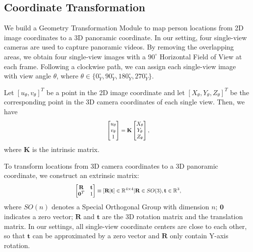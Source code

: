 \documentclass{article}
\begin{document}
\subsection{Coordinate Transformation}
We build a Geometry Transformation Module to map person locations from 2D image coordinates to a 3D panoramic coordinate. In our setting, four single-view cameras are used to capture panoramic videos. By removing the overlapping areas, we obtain four single-view images with a $90^{\circ}$ Horizontal Field of View at each frame. Following a clockwise path, we can assign each single-view image with view angle $\theta$, where $\theta \in \{0^{\circ}_{Y}, 90^{\circ}_{Y},180^{\circ}_{Y}, 270^{\circ}_{Y}\}$.

Let $[u_{\theta}, v_{\theta}]^{T}$ be a point in the 2D image coordinate and let $[X_{\theta}, Y_{\theta}, Z_{\theta}]^{T}$ be the corresponding point in the 3D camera coordinates of each single view. Then, we have 
\begin{equation}
\label{eq:intri}
\centering
\scalebox{0.8}{
\begin{math}
\begin{split}
\begin{bmatrix}
u_{\theta}\\ 
v_{\theta}\\ 
1\\
\end{bmatrix} = \mathbf{K}
\begin{bmatrix}
X_{\theta}\\ 
Y_{\theta}\\ 
Z_{\theta}\\ 
\end{bmatrix},\\
\end{split}
\end{math}}
\end{equation}
where $\mathbf{K}$ is the intrinsic matrix.

To transform locations from 3D camera coordinates to a 3D panoramic coordinate, we construct an extrinsic matrix:
\begin{equation}
\label{eq:extern}
\centering
\scalebox{0.8}{
\begin{math}
\begin{split}
\begin{bmatrix}
\mathbf{R}& \mathbf{t} \\ 
 \mathbf{0}^T& 1 
\end{bmatrix} 
\equiv [\mathbf{R}|\mathbf{t}]
\in \mathbb{R}^{4\times4} | \mathbf{R} \in SO(3), \mathbf{t} \in \mathbb{R}^{3},\\
\end{split}
\end{math}}
\end{equation}
where $SO(n)$ denotes a Special Orthogonal Group with dimension $n$; $\mathbf{0}$ indicates a zero vector; $\mathbf{R}$ and $\mathbf{t}$ are the 3D rotation matrix and the translation matrix. In our settings, all single-view coordinate centers are close to each other, so that $\mathbf{t}$ can be approximated by a zero vector and $\mathbf{R}$ only contain Y-axis rotation.  
\end{document}
